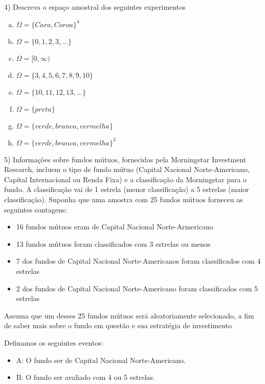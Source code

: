 \documentclass{article}
\begin{document}
4) Descreva o espaço amostral dos seguintes experimentos

\begin{enumerate}[a)] %
    \item $\Omega = \{Cara, Coroa\}^4$
    \item $\Omega= \{0, 1, 2, 3, \dots\}$
    \item $\Omega= [0, \infty)$ 
    \item $\Omega = \{3,4,5,6,7,8,9,10\}$
    \item $\Omega = \{10, 11, 12, 13, \dots \}$
    \item $\Omega = \{preta\}$
    \item $\Omega = \{verde, branca, vermelha\}$ 
    \item $\Omega = \{verde, branca, vermelha\}^2$ 
\end{enumerate}

\vspace{5px}

5) Informações sobre fundos mútuos, fornecidas pela Morningstar Investment Research, incluem o tipo de fundo mútuo (Capital Nacional Norte-Americano, Capital Internacional ou Renda Fixa) e a classificação da Morningstar para o fundo. A classificação vai de 1 estrela (menor classificação) a 5 estrelas (maior classificação). Suponha que uma amostra com 25 fundos mútuos forneceu as seguintes contagens:

\begin{itemize}
    \item 16 fundos mútuos eram de Capital Nacional Norte-Armericano
    \item 13 fundos mútuos foram classificados com 3 estrelas ou menos
    \item 7 dos fundos de Capital Nacional Norte-Americanos foram classificados com 4 estrelas
    \item 2 dos fundos de Capital Nacional Norte-Americano foram classificados com 5 estrelas
\end{itemize}

Assuma que um desses 25 fundos mútuos será aleatoriamente selecionado, a fim de saber mais sobre o fundo em questão e sua estratégia de investimento 

Definamos os seguintes eventos:

 \begin{itemize}
        \item A: O fundo ser de Capital Nacional Norte-Americano.
        \item B: O fundo ser avaliado com 4 ou 5 estrelas. 
    \end{itemize}
    
\end{document}
